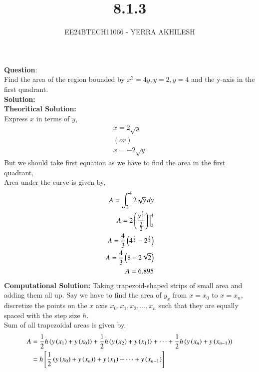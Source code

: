 \documentclass[journal]{IEEEtran}
\begin{document}

\vspace{3cm}

\title{8.1.3}
\author{EE24BTECH11066 - YERRA AKHILESH}
{\let\newpage\relax\maketitle}

\renewcommand{\thefigure}{\theenumi}
\renewcommand{\thetable}{\theenumi}
\setlength{\intextsep}{10pt} %

\renewcommand{\thetable}{\theenumi}
\textbf{Question}:\\
Find the area of the region bounded by $x^2 = 4y, y = 2, y = 4$ and the y-axis in the first quadrant.\\
\textbf{Solution: }\\
\textbf{Theoritical Solution:}\\
Express $x$ in terms of $y$,
\begin{align}
    x = 2 \sqrt{y}\\
    (or) \\
    x = -2 \sqrt{y}
\end{align}
But we should take first equation as we have to find the area in the first quadrant,\\
Area under the curve is given by,
\begin{align}
    A = \int_{2}^{4} 2 \sqrt{y} \, dy\\
    A = 2 \left(\frac{y^{\frac{3}{2}}}{\frac{3}{2}}\right) \Big|_2^4\\
    A = \frac{4}{3} \left(4^{\frac{3}{2}} - 2^{\frac{3}{2}}\right)\\
    A = \frac{4}{3} \left(8 - 2\sqrt{2}\right)\\
    A = 6.895
\end{align}
\textbf{Computational Solution:} 
Taking trapezoid-shaped strips of small area and adding them all up. Say we have to find the area of $y_{x}$ from $x = x_0$ to $x = x_n$, discretize the points on the $x$ axis $x_0, x_1, x_2, \dots, x_n$ such that they are equally spaced with the step size $h$. \\
Sum of all trapezoidal areas is given by,
\begin{align}
  A &= \frac{1}{2}h\left(y\left(x_1\right)+y\left(x_0\right)\right)+ \frac{1}{2}h\left(y\left(x_2\right)+y\left(x_1\right)\right)+\dots+\frac{1}{2}h\left(y\left(x_n\right)+y\left(x_{n-1}\right)\right)\\
  &= h{}\left[\frac{1}{2}\left(y\left(x_0\right)+y\left(x_n\right)\right)+ y\left(x_1\right)+\dots+y\left(x_{n-1}\right)\right]
\end{align}
\end{document}
